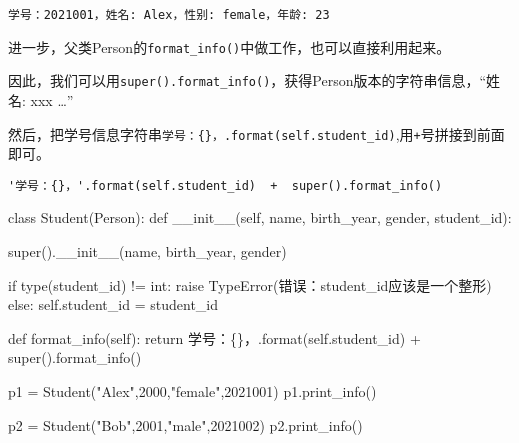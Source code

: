 \documentclass[
  letterpaper,
  DIV=11,
  numbers=noendperiod]{scrreprt}
\newenvironment{Shaded}{\begin{snugshade}}{\end{snugshade}}
\newcommand{\BuiltInTok}[1]{\textcolor[rgb]{0.00,0.23,0.31}{#1}}
\newcommand{\ControlFlowTok}[1]{\textcolor[rgb]{0.00,0.23,0.31}{#1}}
\newcommand{\DecValTok}[1]{\textcolor[rgb]{0.68,0.00,0.00}{#1}}
\newcommand{\FunctionTok}[1]{\textcolor[rgb]{0.28,0.35,0.67}{#1}}
\newcommand{\KeywordTok}[1]{\textcolor[rgb]{0.00,0.23,0.31}{#1}}
\newcommand{\NormalTok}[1]{\textcolor[rgb]{0.00,0.23,0.31}{#1}}
\newcommand{\OperatorTok}[1]{\textcolor[rgb]{0.37,0.37,0.37}{#1}}
\newcommand{\PreprocessorTok}[1]{\textcolor[rgb]{0.68,0.00,0.00}{#1}}
\newcommand{\SpecialCharTok}[1]{\textcolor[rgb]{0.37,0.37,0.37}{#1}}
\newcommand{\StringTok}[1]{\textcolor[rgb]{0.13,0.47,0.30}{#1}}
\newcommand{\VariableTok}[1]{\textcolor[rgb]{0.07,0.07,0.07}{#1}}
\begin{document}
\begin{verbatim}
学号：2021001，姓名: Alex，性别: female，年龄: 23
\end{verbatim}

进一步，父类Person的\texttt{format\_info()}中做工作，也可以直接利用起来。

因此，我们可以用\texttt{super().format\_info()}，获得Person版本的字符串信息，``姓名:
xxx \ldots{}''

然后，把学号信息字符串\texttt{\textquotesingle{}学号：\{\}，\textquotesingle{}.format(self.student\_id)},用\texttt{+}号拼接到前面即可。

\begin{verbatim}
'学号：{}，'.format(self.student_id)  +  super().format_info()
\end{verbatim}

\begin{Shaded}
\begin{Highlighting}[]
\KeywordTok{class}\NormalTok{ Student(Person):}
    \KeywordTok{def} \FunctionTok{\_\_init\_\_}\NormalTok{(}\VariableTok{self}\NormalTok{, name, birth\_year, gender, student\_id):}
        
        \BuiltInTok{super}\NormalTok{().}\FunctionTok{\_\_init\_\_}\NormalTok{(name, birth\_year, gender)}
        
        \ControlFlowTok{if} \BuiltInTok{type}\NormalTok{(student\_id) }\OperatorTok{!=} \BuiltInTok{int}\NormalTok{:}
            \ControlFlowTok{raise} \PreprocessorTok{TypeError}\NormalTok{(}\StringTok{\textquotesingle{}错误：student\_id应该是一个整形\textquotesingle{}}\NormalTok{)}
        \ControlFlowTok{else}\NormalTok{:}
            \VariableTok{self}\NormalTok{.student\_id }\OperatorTok{=}\NormalTok{ student\_id}

    \KeywordTok{def}\NormalTok{ format\_info(}\VariableTok{self}\NormalTok{):}
        \ControlFlowTok{return} \StringTok{\textquotesingle{}学号：}\SpecialCharTok{\{\}}\StringTok{，\textquotesingle{}}\NormalTok{.}\BuiltInTok{format}\NormalTok{(}\VariableTok{self}\NormalTok{.student\_id) }\OperatorTok{+} \BuiltInTok{super}\NormalTok{().format\_info()}
\end{Highlighting}
\end{Shaded}

\begin{Shaded}
\begin{Highlighting}[]
\NormalTok{p1 }\OperatorTok{=}\NormalTok{ Student(}\StringTok{"Alex"}\NormalTok{,}\DecValTok{2000}\NormalTok{,}\StringTok{"female"}\NormalTok{,}\DecValTok{2021001}\NormalTok{)}
\NormalTok{p1.print\_info()}

\NormalTok{p2 }\OperatorTok{=}\NormalTok{ Student(}\StringTok{"Bob"}\NormalTok{,}\DecValTok{2001}\NormalTok{,}\StringTok{"male"}\NormalTok{,}\DecValTok{2021002}\NormalTok{)}
\NormalTok{p2.print\_info()}
\end{Highlighting}
\end{Shaded}
\end{document}
